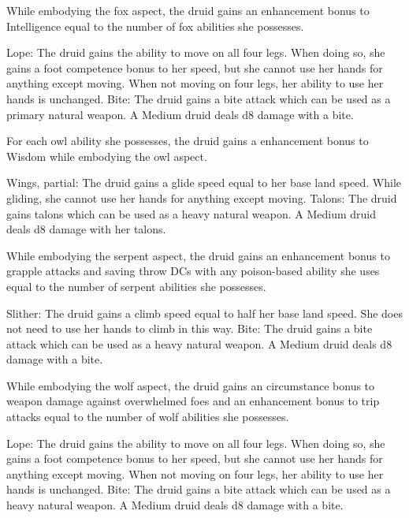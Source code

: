 While embodying the fox aspect, the druid gains an enhancement bonus to Intelligence equal to the number of fox abilities she possesses.
\begin{wildaspect}
\wilditem Lope: The druid gains the ability to move on all four legs. When doing so, she gains a  foot competence bonus to her speed, but she cannot use her hands for anything except moving. When not moving on four legs, her ability to use her hands is unchanged.
\wilditem Bite: The druid gains a bite attack which can be used as a primary natural weapon. A Medium druid deals d8 damage with a bite.
\end{wildaspect}

For each owl ability she possesses, the druid gains a  enhancement bonus to Wisdom  while embodying the owl aspect.
\begin{wildaspect}
\wilditem Wings, partial: The druid gains a glide speed equal to her base land speed. While gliding, she cannot use her hands for anything except moving.
\wilditem Talons: The druid gains talons which can be used as a heavy natural weapon. A Medium druid deals d8 damage with her talons.
\end{wildaspect}

While embodying the serpent aspect, the druid gains an enhancement bonus to grapple attacks and saving throw DCs with any poison-based ability she uses equal to the number of serpent abilities she possesses.
\begin{wildaspect}
\wilditem Slither: The druid gains a climb speed equal to half her base land speed. She does not need to use her hands to climb in this way.
\wilditem Bite: The druid gains a bite attack which can be used as a heavy natural weapon. A Medium druid deals d8 damage with a bite.
\end{wildaspect}

While embodying the wolf aspect, the druid gains an circumstance bonus to weapon damage against overwhelmed foes and an enhancement bonus to trip attacks equal to the number of wolf abilities she possesses.
\begin{wildaspect}
\wilditem Lope: The druid gains the ability to move on all four legs. When doing so, she gains a  foot competence bonus to her speed, but she cannot use her hands for anything except moving. When not moving on four legs, her ability to use her hands is unchanged.
\wilditem Bite: The druid gains a bite attack which can be used as a heavy natural weapon. A Medium druid deals d8 damage with a bite.
\end{wildaspect}

